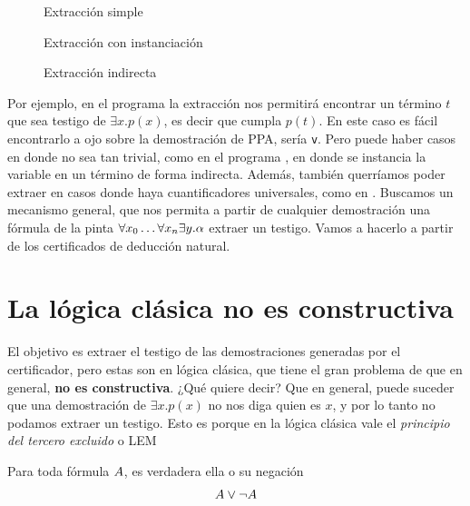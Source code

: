 \begin{multicols}{2}
    \begin{figure}[H]
        
        \caption{Extracción simple}
        \label{fri:prog:exists}
    \end{figure}

    \begin{figure}[H]
        
        \caption{Extracción con instanciación}
        \label{fri:prog:forall}
    \end{figure}
    \begin{figure}[H]
        
        \caption{Extracción indirecta}
        \label{fri:prog:indirect}
    \end{figure}
\end{multicols}

Por ejemplo, en el programa  la extracción nos
permitirá encontrar un término $t$ que sea testigo de $\exists x. p(x)$, es
decir que cumpla $p(t)$. En este caso es fácil encontrarlo a ojo sobre la
demostración de PPA, sería \lstinline{v}. Pero puede haber casos en donde no sea
tan trivial, como en el programa , en donde se
instancia la variable en un término de forma indirecta. Además, también
querríamos poder extraer en casos donde haya cuantificadores universales, como
en . Buscamos un mecanismo general, que nos permita a
partir de cualquier demostración una fórmula de la pinta $\forall x_0 \dots
\forall x_n \exists y . \alpha$ extraer un testigo. Vamos a hacerlo a
partir de los certificados de deducción natural.

\section{La lógica clásica no es constructiva}

El objetivo es extraer el testigo de las demostraciones generadas por el
certificador, pero estas son en lógica clásica, que tiene el gran problema de
que en general, \textbf{no es constructiva}. ¿Qué quiere decir? Que en general,
puede suceder que una demostración de $\exists x . p(x)$ no nos diga quien es
$x$, y por lo tanto no podamos extraer un testigo. Esto es porque en la lógica
clásica vale el \textit{principio del tercero excluido} o LEM

\begin{prop}[LEM] Para toda fórmula $A$, es verdadera ella o su negación
    \[ A \vee \neg A \]
\end{prop}

